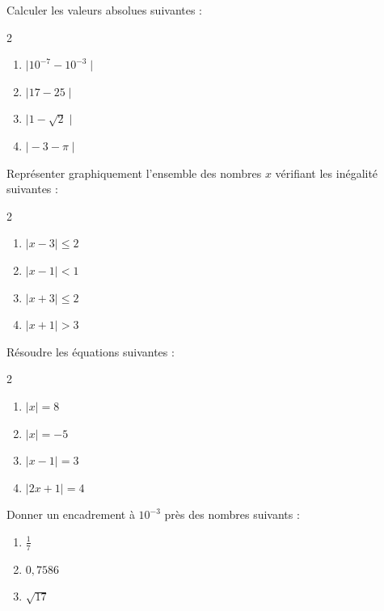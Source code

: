 \medskip

\exo %

Calculer les valeurs absolues suivantes :

\begin{multicols}{2}
\begin{enumerate}
\item $\mid 10^{-7}-10^{-3} \mid$
\item $\mid 17 - 25 \mid$
\item $\mid 1 - \sqrt{2} \mid$
\item $\mid -3 - \pi \mid $
\end{enumerate}
\end{multicols}

\medskip

\exo

Représenter graphiquement l'ensemble des nombres $x$ vérifiant les inégalité suivantes :

\begin{multicols}{2}
\begin{enumerate}
\item $\mid x -3 \mid \leqslant 2$
\item $\mid x - 1 \mid < 1 $
\item $ \mid x + 3 \mid \leqslant 2$
\item $ \mid x + 1 \mid > 3$
\end{enumerate}
\end{multicols}

\medskip

\exo %

Résoudre les équations suivantes :

\begin{multicols}{2}
\begin{enumerate}
\item $\mid x \mid = 8$
\item $\mid x \mid = - 5$
\item $\mid x - 1 \mid = 3$
\item $\mid 2x + 1 \mid =4$
\end{enumerate}
\end{multicols}

\medskip




\exo %

Donner un encadrement à $10^{-3}$ près des nombres suivants :

\begin{enumerate}
\item $\frac{1}{7}$ 
\item $0,7586$
\item $\sqrt{17}$
\end{enumerate}


